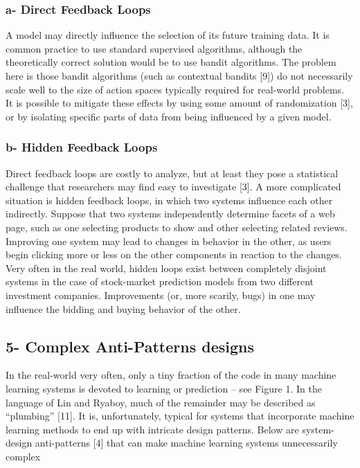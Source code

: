 \documentclass[]{article}
\begin{document}
\subsubsection{a- Direct Feedback Loops}\label{a--direct-feedback-loops}

A model may directly influence the selection of its future training
data. It is common practice to use standard supervised algorithms,
although the theoretically correct solution would be to use bandit
algorithms. The problem here is those bandit algorithms (such as
contextual bandits {[}9{]}) do not necessarily scale well to the size of
action spaces typically required for real-world problems. It is possible
to mitigate these effects by using some amount of randomization {[}3{]},
or by isolating specific parts of data from being influenced by a given
model.

\subsubsection{b- Hidden Feedback Loops}\label{b--hidden-feedback-loops}

Direct feedback loops are costly to analyze, but at least they pose a
statistical challenge that researchers may find easy to investigate
{[}3{]}. A more complicated situation is hidden feedback loops, in which
two systems influence each other indirectly. Suppose that two systems
independently determine facets of a web page, such as one selecting
products to show and other selecting related reviews. Improving one
system may lead to changes in behavior in the other, as users begin
clicking more or less on the other components in reaction to the
changes. Very often in the real world, hidden loops exist between
completely disjoint systems in the case of stock-market prediction
models from two different investment companies. Improvements (or, more
scarily, bugs) in one may influence the bidding and buying behavior of
the other.

\subsection{5- Complex Anti-Patterns
designs}\label{complex-anti-patterns-designs}

In the real-world very often, only a tiny fraction of the code in many
machine learning systems is devoted to learning or prediction -- see
Figure 1. In the language of Lin and Ryaboy, much of the remainder may
be described as ``plumbing'' {[}11{]}. It is, unfortunately, typical for
systems that incorporate machine learning methods to end up with
intricate design patterns. Below are system-design anti-patterns {[}4{]}
that can make machine learning systems unnecessarily complex
\end{document}
